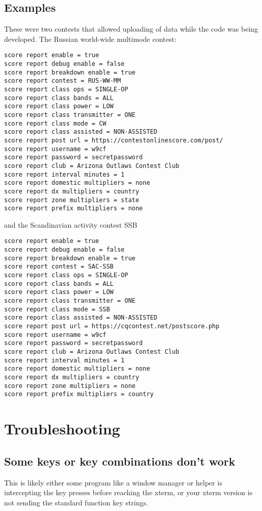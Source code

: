 \documentclass[12pt]{article}
\begin{document}
\subsection{Examples}
These were two contests that allowed uploading of data while the code
was being developed.
The Russian world-wide multimode contest:
\begin{verbatim}
score report enable = true
score report debug enable = false
score report breakdown enable = true
score report contest = RUS-WW-MM
score report class ops = SINGLE-OP
score report class bands = ALL
score report class power = LOW
score report class transmitter = ONE
score report class mode = CW
score report class assisted = NON-ASSISTED
score report post url = https://contestonlinescore.com/post/
score report username = w9cf
score report password = secretpassword
score report club = Arizona Outlaws Contest Club
score report interval minutes = 1
score report domestic multipliers = none
score report dx multipliers = country
score report zone multipliers = state
score report prefix multipliers = none
\end{verbatim}
and the Scandinavian activity contest SSB
\begin{verbatim}
score report enable = true
score report debug enable = false
score report breakdown enable = true
score report contest = SAC-SSB
score report class ops = SINGLE-OP
score report class bands = ALL
score report class power = LOW
score report class transmitter = ONE
score report class mode = SSB
score report class assisted = NON-ASSISTED
score report post url = https://cqcontest.net/postscore.php
score report username = w9cf
score report password = secretpassword
score report club = Arizona Outlaws Contest Club
score report interval minutes = 1
score report domestic multipliers = none
score report dx multipliers = country
score report zone multipliers = none
score report prefix multipliers = country
\end{verbatim}


\section{Troubleshooting}
\subsection{Some keys or key combinations don't work}
This is likely either some program like a window manager or helper
is intercepting the key presses before reaching the xterm, or your xterm
version is not sending the standard function key strings.
\end{document}
